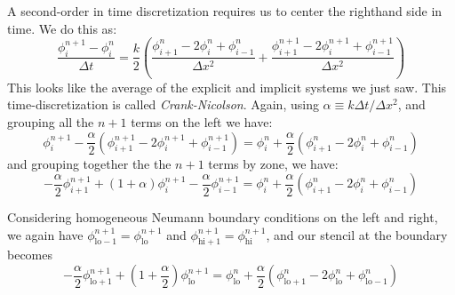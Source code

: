 A second-order in time discretization requires us to center the
righthand side in time.  We do this as:
\begin{equation}
\frac{\phi_i^{n+1} - \phi_i^n}{\Delta t} = 
  \frac{k}{2} \left ( \frac{\phi_{i+1}^{n} - 2\phi_i^{n} + \phi_{i-1}^{n}}{\Delta x^2} +
                      \frac{\phi_{i+1}^{n+1} - 2\phi_i^{n+1} + \phi_{i-1}^{n+1}}{\Delta x^2} \right )
\end{equation}
This looks like the average of the explicit and implicit systems we just saw.
This time-discretization is called {\em Crank-Nicolson}.  Again, using
$\alpha \equiv k\Delta t / \Delta x^2$, and grouping all the $n+1$
terms on the left we have:
\begin{equation}
\phi^{n+1}_i - \frac{\alpha}{2} \left ( \phi^{n+1}_{i+1} - 2\phi^{n+1}_i + \phi^{n+1}_{i-1} \right )
  = \phi^n_i + \frac{\alpha}{2} \left ( \phi^{n}_{i+1} - 2\phi^{n}_i + \phi^{n}_{i-1} \right )
\end{equation}
and grouping together the the $n+1$ terms by zone, we have:
\begin{equation}
-\frac{\alpha}{2} \phi^{n+1}_{i+1} + (1 + \alpha)\phi^{n+1}_i - \frac{\alpha}{2} \phi^{n+1}_{i-1}
  = \phi^n_i + \frac{\alpha}{2} \left ( \phi^n_{i+1} - 2 \phi^n_i + \phi^n_{i-1} \right )
\end{equation}

Considering homogeneous Neumann boundary conditions on the left and
right, we again have $\phi^{n+1}_\mathrm{lo-1} =
\phi^{n+1}_\mathrm{lo}$ and $\phi^{n+1}_\mathrm{hi+1} =
\phi^{n+1}_\mathrm{hi}$, and our stencil at the boundary becomes
\begin{equation}
-\frac{\alpha}{2} \phi^{n+1}_\mathrm{lo+1} + \left (1 + \frac{\alpha}{2} \right ) \phi^{n+1}_\mathrm{lo} =
    \phi^n_\mathrm{lo} + \frac{\alpha}{2} \left ( \phi^{n}_\mathrm{lo+1} - 2\phi^{n}_\mathrm{lo} + \phi^{n}_\mathrm{lo-1} \right )
\end{equation}


